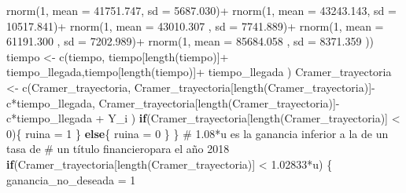 \documentclass[
  us-letterpaper,
]{scrreprt}
\newenvironment{Shaded}{\begin{snugshade}}{\end{snugshade}}
\newcommand{\AttributeTok}[1]{\textcolor[rgb]{0.40,0.45,0.13}{#1}}
\newcommand{\CommentTok}[1]{\textcolor[rgb]{0.37,0.37,0.37}{#1}}
\newcommand{\ControlFlowTok}[1]{\textcolor[rgb]{0.00,0.23,0.31}{\textbf{#1}}}
\newcommand{\DecValTok}[1]{\textcolor[rgb]{0.68,0.00,0.00}{#1}}
\newcommand{\FloatTok}[1]{\textcolor[rgb]{0.68,0.00,0.00}{#1}}
\newcommand{\FunctionTok}[1]{\textcolor[rgb]{0.28,0.35,0.67}{#1}}
\newcommand{\NormalTok}[1]{\textcolor[rgb]{0.00,0.23,0.31}{#1}}
\newcommand{\OtherTok}[1]{\textcolor[rgb]{0.00,0.23,0.31}{#1}}
\newcommand{\SpecialCharTok}[1]{\textcolor[rgb]{0.37,0.37,0.37}{#1}}
\theoremstyle{plain}
\theoremstyle{plain}
\theoremstyle{definition}
\theoremstyle{remark}
\begin{document}
\begin{Shaded}
\begin{Highlighting}[]
              \FunctionTok{rnorm}\NormalTok{(}\DecValTok{1}\NormalTok{, }\AttributeTok{mean =}   \FloatTok{41751.747}\NormalTok{, }\AttributeTok{sd =} \FloatTok{5687.030}\NormalTok{)}\SpecialCharTok{+} 
              \FunctionTok{rnorm}\NormalTok{(}\DecValTok{1}\NormalTok{, }\AttributeTok{mean =}   \FloatTok{43243.143}\NormalTok{, }\AttributeTok{sd =} \FloatTok{10517.841}\NormalTok{)}\SpecialCharTok{+} 
              \FunctionTok{rnorm}\NormalTok{(}\DecValTok{1}\NormalTok{, }\AttributeTok{mean =} \FloatTok{43010.307}\NormalTok{  , }\AttributeTok{sd =} \FloatTok{7741.889}\NormalTok{)}\SpecialCharTok{+} 
              \FunctionTok{rnorm}\NormalTok{(}\DecValTok{1}\NormalTok{, }\AttributeTok{mean =} \FloatTok{61191.300}\NormalTok{  , }\AttributeTok{sd =} \FloatTok{7202.989}\NormalTok{)}\SpecialCharTok{+} 
              \FunctionTok{rnorm}\NormalTok{(}\DecValTok{1}\NormalTok{, }\AttributeTok{mean =}  \FloatTok{85684.058}\NormalTok{ , }\AttributeTok{sd =} \FloatTok{8371.359}\NormalTok{ )) }
\NormalTok{    tiempo }\OtherTok{\textless{}{-}} \FunctionTok{c}\NormalTok{(tiempo, tiempo[}\FunctionTok{length}\NormalTok{(tiempo)]}\SpecialCharTok{+} 
\NormalTok{                  tiempo\_llegada,tiempo[}\FunctionTok{length}\NormalTok{(tiempo)]}\SpecialCharTok{+} 
\NormalTok{                  tiempo\_llegada ) }
\NormalTok{    Cramer\_trayectoria }\OtherTok{\textless{}{-}} \FunctionTok{c}\NormalTok{(Cramer\_trayectoria,}
\NormalTok{                      Cramer\_trayectoria[}\FunctionTok{length}\NormalTok{(Cramer\_trayectoria)]}\SpecialCharTok{{-}}
\NormalTok{                      c}\SpecialCharTok{*}\NormalTok{tiempo\_llegada, }
\NormalTok{                      Cramer\_trayectoria[}\FunctionTok{length}\NormalTok{(Cramer\_trayectoria)]}\SpecialCharTok{{-}} 
\NormalTok{                      c}\SpecialCharTok{*}\NormalTok{tiempo\_llegada }\SpecialCharTok{+}\NormalTok{  Y\_i )}
    \ControlFlowTok{if}\NormalTok{(Cramer\_trayectoria[}\FunctionTok{length}\NormalTok{(Cramer\_trayectoria)] }\SpecialCharTok{\textless{}} \DecValTok{0}\NormalTok{)\{}
\NormalTok{      ruina }\OtherTok{=} \DecValTok{1}
\NormalTok{    \}}
    \ControlFlowTok{else}\NormalTok{\{}
\NormalTok{      ruina }\OtherTok{=} \DecValTok{0}
\NormalTok{    \}}
\NormalTok{  \}}
\CommentTok{\# 1.08*u es la ganancia inferior a la de un tasa de }
\CommentTok{\# un título financieropara el año 2018}
  \ControlFlowTok{if}\NormalTok{(Cramer\_trayectoria[}\FunctionTok{length}\NormalTok{(Cramer\_trayectoria)] }\SpecialCharTok{\textless{}} \FloatTok{1.02833}\SpecialCharTok{*}\NormalTok{u) \{}
\NormalTok{    ganancia\_no\_deseada }\OtherTok{=} \DecValTok{1}
    

\end{Highlighting}
\end{Shaded}
\end{document}
